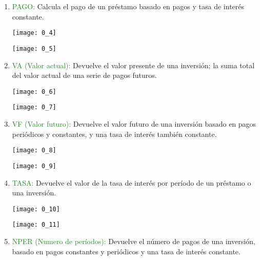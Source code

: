 \begin{enumerate}
    \begin{enumerate}
    \renewcommand{\labelenumi}{\roman{enumi}}
        \item \textcolor{ForestGreen}{PAGO:} Calcula el pago de un préstamo basado en pagos y tasa de interés constante.
        \begin{center}
        \texttt{[image: 0\_4]} \\
        \end{center}
        \begin{center}
        \texttt{[image: 0\_5]} 
        \end{center}
        \item \textcolor{ForestGreen}{VA (Valor actual):} Devuelve el valor presente de una inversión; la suma total del valor actual de una serie de pagos futuros.
        \begin{center}
        \texttt{[image: 0\_6]} \\
        \end{center}
        \begin{center}
        \texttt{[image: 0\_7]}
        \end{center}
        \item \textcolor{ForestGreen}{VF (Valor futuro):} Devuelve el valor futuro de una inversión basado en pagos periódicos y constantes, y una tasa de interés también constante.
        \begin{center}
        \texttt{[image: 0\_8]} \\
        \end{center}
        \begin{center}
        \texttt{[image: 0\_9]}
        \end{center}
        \item \textcolor{ForestGreen}{TASA:} Devuelve el valor de la tasa de interés por período de un préstamo o una inversión.
        \begin{center}
        \texttt{[image: 0\_10]} \\
        \end{center}
        \begin{center}
        \texttt{[image: 0\_11]}
        \end{center}
        \item \textcolor{ForestGreen}{NPER (Numero de períodos):} Devuelve el número de pagos de una inversión, basado en pagos constantes y periódicos y una tasa de interés constante.

\end{enumerate}
\end{enumerate}
